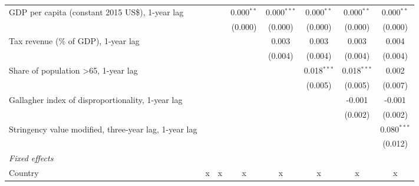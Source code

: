 \begin{tabular}{lccccccc}
   GDP per capita (constant 2015 US\$), 1-year lag                                          &              &               & 0.000$^{**}$  & 0.000$^{***}$ & 0.000$^{**}$  & 0.000$^{**}$  & 0.000$^{**}$\\   
                                                                                            &              &               & (0.000)       & (0.000)       & (0.000)       & (0.000)       & (0.000)\\   
   Tax revenue (\% of GDP), 1-year lag                                                      &              &               &               & 0.003         & 0.003         & 0.003         & 0.004\\   
                                                                                            &              &               &               & (0.004)       & (0.004)       & (0.004)       & (0.004)\\   
   Share of population >65, 1-year lag                                                      &              &               &               &               & 0.018$^{***}$ & 0.018$^{***}$ & 0.002\\   
                                                                                            &              &               &               &               & (0.005)       & (0.005)       & (0.007)\\   
   Gallagher index of disproportionality, 1-year lag                                        &              &               &               &               &               & -0.001        & -0.001\\   
                                                                                            &              &               &               &               &               & (0.002)       & (0.002)\\   
   Stringency value modified, three-year lag, 1-year lag                                    &              &               &               &               &               &               & 0.080$^{***}$\\   
                                                                                            &              &               &               &               &               &               & (0.012)\\   
   \emph{Fixed effects}\\
   Country                                                                                  & x            & x             & x             & x             & x             & x             & x\\  

\end{tabular}
